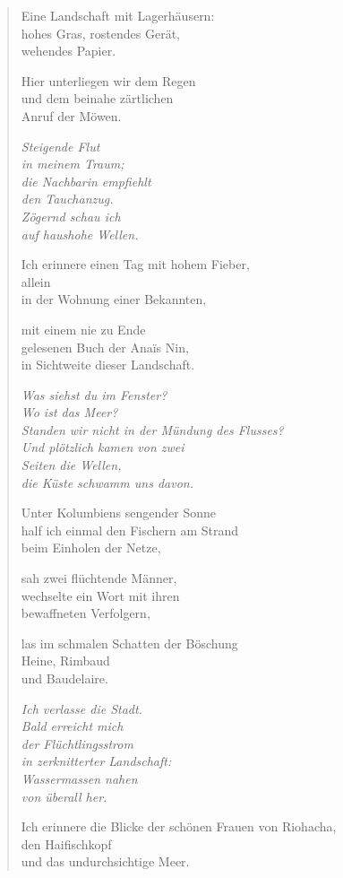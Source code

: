 
\cleartoverso


\begin{verse}

Eine Landschaft mit Lagerhäusern:\\
hohes Gras, rostendes Gerät,\\
wehendes Papier.

Hier unterliegen wir dem Regen\\
und dem beinahe zärtlichen\\
Anruf der Möwen.

{\itshape
Steigende Flut\\
in meinem Traum;\\
die Nachbarin empfiehlt\\
den Tauchanzug.\\
Zögernd schau ich\\
auf haushohe Wellen.}

Ich erinnere einen Tag mit hohem Fieber,\\
allein\\
in der Wohnung einer Bekannten,

mit einem nie zu Ende\\
gelesenen Buch der Anaïs Nin,\\
in Sichtweite dieser Landschaft.

{\itshape
Was siehst du im Fenster?\\
Wo ist das Meer?\\
Standen wir nicht in der Mündung des Flusses?\\
Und plötzlich kamen von zwei\\
Seiten die Wellen,\\
die Küste schwamm uns davon.}

Unter Kolumbiens sengender Sonne\\
half ich einmal den Fischern am Strand\\
beim Einholen der Netze,

sah zwei flüchtende Männer,\\
wechselte ein Wort mit ihren\\
bewaffneten Verfolgern,

las im schmalen Schatten der Böschung\\
Heine, Rimbaud\\
und Baudelaire.

{\itshape
Ich verlasse die Stadt.\\
Bald erreicht mich\\
der Flüchtlingsstrom\\
in zerknitterter Landschaft:\\
Wassermassen nahen\\
von überall her.}

Ich erinnere die Blicke der schönen Frauen von Riohacha,\\
den Haifischkopf\\
und das undurchsichtige Meer.

\end{verse}

